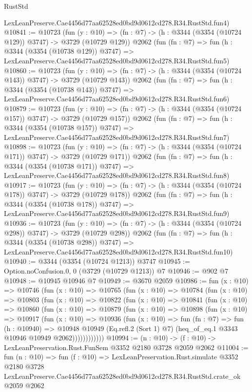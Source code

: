 \begin{lexlean}{RustStd}
\begin{coremodule}
    LexLeanPreserve.Cae4456d77aa62528ed0bd9d0612cd278.R34.RustStd.fun4)
@10841 := @10723
    (fun (y : @10) => (fn : @7) -> (h : @3344 (@3354 (@10724 @129)) @3747) -> @3729 (@10729 @129))
    @2062
    (fun (fn : @7) =>
    fun (h : @3344 (@3354 (@10738 @129)) @3747) =>
    LexLeanPreserve.Cae4456d77aa62528ed0bd9d0612cd278.R34.RustStd.fun5)
@10860 := @10723
    (fun (y : @10) => (fn : @7) -> (h : @3344 (@3354 (@10724 @143)) @3747) -> @3729 (@10729 @143))
    @2062
    (fun (fn : @7) =>
    fun (h : @3344 (@3354 (@10738 @143)) @3747) =>
    LexLeanPreserve.Cae4456d77aa62528ed0bd9d0612cd278.R34.RustStd.fun6)
@10879 := @10723
    (fun (y : @10) => (fn : @7) -> (h : @3344 (@3354 (@10724 @157)) @3747) -> @3729 (@10729 @157))
    @2062
    (fun (fn : @7) =>
    fun (h : @3344 (@3354 (@10738 @157)) @3747) =>
    LexLeanPreserve.Cae4456d77aa62528ed0bd9d0612cd278.R34.RustStd.fun7)
@10898 := @10723
    (fun (y : @10) => (fn : @7) -> (h : @3344 (@3354 (@10724 @171)) @3747) -> @3729 (@10729 @171))
    @2062
    (fun (fn : @7) =>
    fun (h : @3344 (@3354 (@10738 @171)) @3747) =>
    LexLeanPreserve.Cae4456d77aa62528ed0bd9d0612cd278.R34.RustStd.fun8)
@10917 := @10723
    (fun (y : @10) => (fn : @7) -> (h : @3344 (@3354 (@10724 @178)) @3747) -> @3729 (@10729 @178))
    @2062
    (fun (fn : @7) =>
    fun (h : @3344 (@3354 (@10738 @178)) @3747) =>
    LexLeanPreserve.Cae4456d77aa62528ed0bd9d0612cd278.R34.RustStd.fun9)
@10936 := @10723
    (fun (y : @10) => (fn : @7) -> (h : @3344 (@3354 (@10724 @298)) @3747) -> @3729 (@10729 @298))
    @2062
    (fun (fn : @7) =>
    fun (h : @3344 (@3354 (@10738 @298)) @3747) =>
    LexLeanPreserve.Cae4456d77aa62528ed0bd9d0612cd278.R34.RustStd.fun10)
@10940 := @3344 (@3354 (@10724 @1213)) @3747
@10945 := Option.noConfusion.{0, 0} (@3729 (@10729 @1213)) @7
@10946 := @902 @7
@10948 := @10945 @10946 @7
@10949 := @3670 @2059
@10986 := fun (x : @10) =>
  @10746
    (fun (x : @10) =>
    @10765
      (fun (x : @10) =>
      @10784
        (fun (x : @10) =>
        @10803
          (fun (x : @10) =>
          @10822
            (fun (x : @10) =>
            @10841
              (fun (x : @10) =>
              @10860
                (fun (x : @10) =>
                @10879
                  (fun (x : @10) =>
                  @10898
                    (fun (x : @10) =>
                    @10917
                      (fun (x : @10) =>
                      @10936
                        (fun (x : @10) =>
                        fun (fn : @7) =>
                        fun (h : @10940) =>
                        @10948
                          @10949
                          (Eq.refl.{2} (Sort 1) @7)
                          (heq_of_eq.{1} @3343 @10946 @10949 @2062))))))))))))
@10994 := (n : @10) -> (f : @10) -> LexLeanPreservation.Rust.FunSem @3352 @2180 @3728 @2059 @2062
@11004 := fun (n : @10) =>
  fun (f : @10) =>
  LexLeanPreservation.Rust.simulate
    @3352
    @2180
    @3728
    LexLeanPreserve.Cae4456d77aa62528ed0bd9d0612cd278.R34.RustStd.crate_ok
    @2059
    @2062
\end{coremodule}
\end{lexlean}
